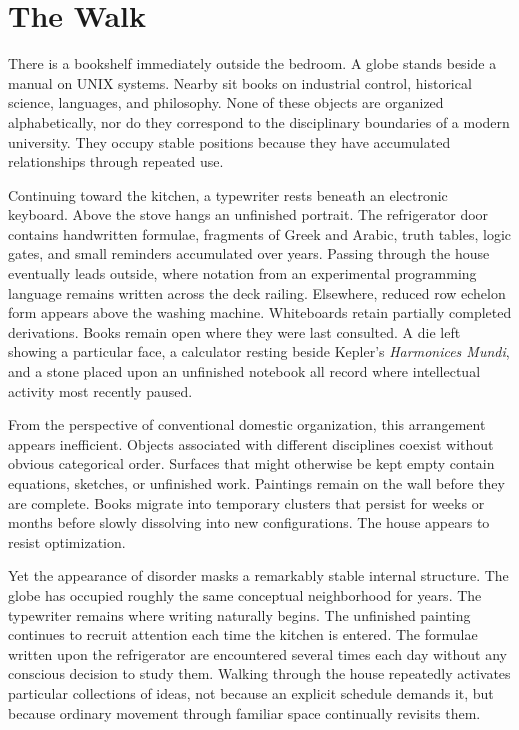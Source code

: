 \documentclass[12pt,oneside]{article}
\theoremstyle{remark}
\begin{document}

\section{The Walk}

There is a bookshelf immediately outside the bedroom. A globe stands beside a manual on UNIX systems. Nearby sit books on industrial control, historical science, languages, and philosophy. None of these objects are organized alphabetically, nor do they correspond to the disciplinary boundaries of a modern university. They occupy stable positions because they have accumulated relationships through repeated use.

Continuing toward the kitchen, a typewriter rests beneath an electronic keyboard. Above the stove hangs an unfinished portrait. The refrigerator door contains handwritten formulae, fragments of Greek and Arabic, truth tables, logic gates, and small reminders accumulated over years. Passing through the house eventually leads outside, where notation from an experimental programming language remains written across the deck railing. Elsewhere, reduced row echelon form appears above the washing machine. Whiteboards retain partially completed derivations. Books remain open where they were last consulted. A die left showing a particular face, a calculator resting beside Kepler's \emph{Harmonices Mundi}, and a stone placed upon an unfinished notebook all record where intellectual activity most recently paused.

From the perspective of conventional domestic organization, this arrangement appears inefficient. Objects associated with different disciplines coexist without obvious categorical order. Surfaces that might otherwise be kept empty contain equations, sketches, or unfinished work. Paintings remain on the wall before they are complete. Books migrate into temporary clusters that persist for weeks or months before slowly dissolving into new configurations. The house appears to resist optimization.

Yet the appearance of disorder masks a remarkably stable internal structure. The globe has occupied roughly the same conceptual neighborhood for years. The typewriter remains where writing naturally begins. The unfinished painting continues to recruit attention each time the kitchen is entered. The formulae written upon the refrigerator are encountered several times each day without any conscious decision to study them. Walking through the house repeatedly activates particular collections of ideas, not because an explicit schedule demands it, but because ordinary movement through familiar space continually revisits them.
\end{document}
